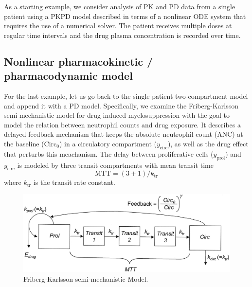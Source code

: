 
As a starting example, we consider analysis of PK and PD data from a
single patient using a PKPD model described in terms of a nonlinear ODE
system that requires the use of a numerical solver.
The patient receives multiple doses at regular time intervals and the drug plasma concentration is recorded over time.

\subsection{Nonlinear pharmacokinetic / pharmacodynamic model} 
For the last example, let us go back to the single patient
two-compartment model and append it with a PD
model. Specifically, we examine the
Friberg-Karlsson semi-mechanistic model for drug-induced
myelosuppression \cite{3181,2364,2518,3187,3188,3537} with the goal to model the
relation between neutrophil counts and drug exposure.
It describes a delayed feedback mechanism that keeps the absolute neutrophil count (ANC) at the
baseline ($\text{Circ}_0$) in a circulatory compartment ($y_{\text{circ}}$), as well as the drug
effect that perturbs this meachanism. The delay between
proliferative cells ($y_{\text{prol}}$) and $y_{\text{circ}}$ is modeled by three
transit compartments with mean transit time
\begin{equation}
  \text{MTT} = (3 + 1)/k_{\text{tr}}
\end{equation}
where $k_{\text{tr}}$ is the transit rate constant.
\begin{figure}
  \begin{center}
  \includegraphics[width=5in]{../figures/neutrophilModel.jpg}
  \caption{Friberg-Karlsson semi-mechanistic Model.}
  \label{fig:fk_model}
  \end{center}
\end{figure}

